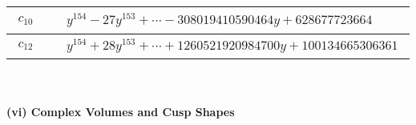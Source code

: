 \documentclass[1p]{elsarticle_modified}
\theoremstyle{definition}
\begin{document}
\begin{tabular}{m{50pt}|m{274pt}}
\hline $$\begin{aligned}c_{10}\end{aligned}$$&$\begin{aligned}
&y^{154}-27 y^{153}+\cdots-308019410590464 y+628677723664
\end{aligned}$\\
\hline $$\begin{aligned}c_{12}\end{aligned}$$&$\begin{aligned}
&y^{154}+28 y^{153}+\cdots+1260521920984700 y+100134665306361
\end{aligned}$\\
\hline
\end{tabular}\\~\\
\newpage\flushleft \textbf{(vi) Complex Volumes and Cusp Shapes}
\end{document}
